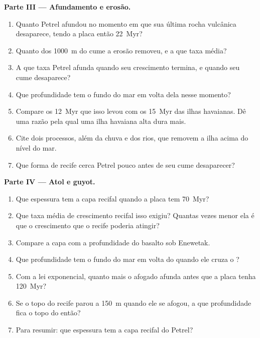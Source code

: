\begin{problem}
\noindent\textbf{Parte III --- Afundamento e erosão.}
\begin{enumerate}[resume]
  \item Quanto Petrel afundou no momento em que sua última rocha vulcânica desaparece, tendo a placa
        então \qty{22}{Myr}?
  \item Quanto dos \qty{1000}{m} do cume a erosão removeu, e a que taxa média?
  \item A que taxa Petrel afunda quando seu crescimento termina, e quando seu cume desaparece?
  \item Que profundidade tem o fundo do mar em volta dela nesse momento?
  \item Compare os \qty{12}{Myr} que isso levou com os \qty{15}{Myr} das ilhas havaianas. Dê uma
        razão pela qual uma ilha havaiana alta dura mais.
  \item Cite dois processos, além da chuva e dos rios, que removem a ilha acima do nível do mar.
  \item Que forma de recife cerca Petrel pouco antes de seu cume desaparecer?
\end{enumerate}

\noindent\textbf{Parte IV --- Atol e guyot.}
\begin{enumerate}[resume]
  \item Que espessura tem a capa recifal quando a placa tem \qty{70}{Myr}?
  \item Que taxa média de crescimento recifal isso exigiu? Quantas vezes menor ela é que o crescimento
        que o recife poderia atingir?
  \item Compare a capa com a profundidade do basalto sob Enewetak.
  \item Que profundidade tem o fundo do mar em volta do  quando ele cruza o ?
  \item Com a lei exponencial, quanto mais o  afogado afunda antes que a placa tenha
        \qty{120}{Myr}?
  \item Se o topo do recife parou a \qty{150}{m} quando ele se afogou, a que profundidade fica o topo do
         então?
  \item Para resumir: que espessura tem a capa recifal do  Petrel?
\end{enumerate}
\end{problem}
